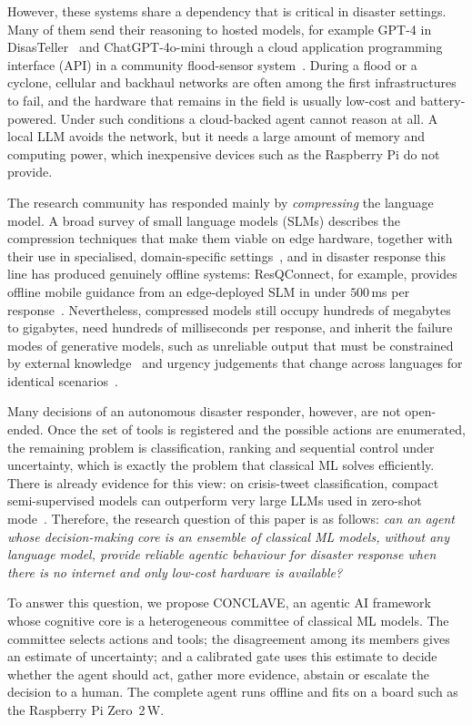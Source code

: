 \documentclass[journal]{IEEEtran}
\begin{document}
However, these systems share a dependency that is critical in disaster
settings. Many of them send their reasoning to hosted models, for example
GPT-4 in DisasTeller~\cite{chen2026integration} and ChatGPT-4o-mini through a
cloud application programming interface (API) in a community flood-sensor
system~\cite{ou2025combination}. During a flood or a cyclone, cellular and
backhaul networks are often among the first infrastructures to fail, and the
hardware that remains in the field is usually low-cost and battery-powered.
Under such conditions a cloud-backed agent cannot reason at all. A local LLM
avoids the network, but it needs a large amount of memory and computing power,
which inexpensive devices such as the Raspberry Pi do not provide.

The research community has responded mainly by \emph{compressing} the language
model. A broad survey of small language models (SLMs) describes the
compression techniques that make them viable on edge hardware, together with
their use in specialised, domain-specific
settings~\cite{wang2024comprehensive}, and in disaster response this line has
produced genuinely offline systems: ResQConnect, for example, provides offline
mobile guidance from an edge-deployed SLM in under $500$\,ms per
response~\cite{aththanayake2026resqconnect}. Nevertheless, compressed models
still occupy hundreds of megabytes to gigabytes, need hundreds of milliseconds
per response, and inherit the failure modes of generative models, such as
unreliable output that must be constrained by external
knowledge~\cite{chen2024enhancing} and urgency judgements that change across
languages for identical scenarios~\cite{ticona2026llm}.

Many decisions of an autonomous disaster responder, however, are not
open-ended. Once the set of tools is registered and the possible actions are
enumerated, the remaining problem is classification, ranking and sequential
control under uncertainty, which is exactly the problem that classical ML
solves efficiently. There is already evidence for this view: on crisis-tweet
classification, compact semi-supervised models can outperform very large LLMs
used in zero-shot mode~\cite{ativo2026llm}. Therefore, the research question of
this paper is as follows: \emph{can an agent whose decision-making core is an
ensemble of classical ML models, without any language model, provide reliable
agentic behaviour for disaster response when there is no internet and only
low-cost hardware is available?}

To answer this question, we propose CONCLAVE, an agentic AI framework whose
cognitive core is a heterogeneous committee of classical ML models. The
committee selects actions and tools; the disagreement among its members gives
an estimate of uncertainty; and a calibrated gate uses this estimate to decide
whether the agent should act, gather more evidence, abstain or escalate the
decision to a human. The complete agent runs offline and fits on a board such
as the Raspberry Pi Zero~2\,W.
\end{document}

